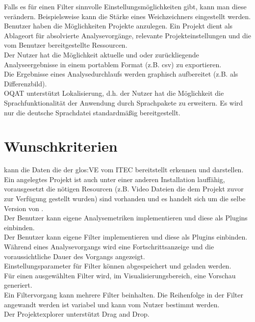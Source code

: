  Falls es für einen Filter sinnvolle Einstellungsmöglichkeiten gibt, kann man diese verändern. Beispielsweise kann die Stärke eines Weichzeichners eingestellt werden.\\
 Benutzer haben die Möglichkeiten Projekte anzulegen. Ein Projekt dient als Ablageort für
absolvierte Analysevorgänge, relevante Projekteinstellungen und die vom Benutzer bereitgestellte Ressourcen.\\
 Der Nutzer hat die Möglichkeit aktuelle und oder zurückliegende Analyseergebnisse in einem portablem Format (z.B. \gls{csv}) zu exportieren.\\
 Die Ergebnisse eines Analysedurchlaufs werden graphisch aufbereitet (z.B. als Differenzbild).\\
 \gls{OQAT} unterstützt Lokalisierung, d.h. der Nutzer hat die Möglichkeit die Sprachfunktionalität der Anwendung durch Sprachpakete zu erweitern. Es wird nur die deutsche Sprachdatei standardmäßig bereitgestellt.
\section{Wunschkriterien}
\setcounter{counterKriterien}{0}
% 
 \projektTitel kann die Daten die der \gls{glos:VE} vom \gls{ITEC}  bereitstellt erkennen und darstellen.\\
 Ein angelegtes Projekt ist auch unter einer anderen \projektTitel Installation lauffähig, vorausgesetzt die nötigen Resourcen (z.B. Video Dateien die dem Projekt zuvor zur Verfügung gestellt wurden)  sind vorhanden und es handelt sich um die selbe Version von \projektTitel.\\
 Der Benutzer kann eigene Analysemetriken implementieren und diese als Plugins einbinden.\\
 Der Benutzer kann eigene Filter implementieren und diese als Plugins einbinden.\\
 Während eines Analysevorgangs wird eine Fortschrittsanzeige und die voraussichtliche Dauer des Vorgangs angezeigt.\\
 Einstellungsparameter für Filter können abgespeichert und geladen werden.\\
 Für einen ausgewählten Filter wird, im Visualisierungsbereich, eine Vorschau generiert.\\
 Ein Filtervorgang kann mehrere Filter beinhalten. Die Reihenfolge in der Filter angewandt
werden ist variabel und kann vom Nutzer bestimmt werden.\\
 Der Projektexplorer unterstützt Drag and Drop.
